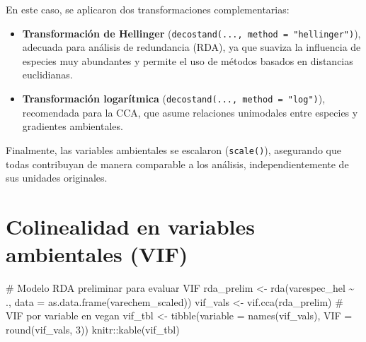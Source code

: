 \documentclass[
  spanish,
  11pt,
  a4paper,
  DIV=11,
  numbers=noendperiod]{scrartcl}
\newenvironment{Shaded}{\begin{snugshade}}{\end{snugshade}}
\newcommand{\AttributeTok}[1]{\textcolor[rgb]{0.40,0.45,0.13}{#1}}
\newcommand{\CommentTok}[1]{\textcolor[rgb]{0.37,0.37,0.37}{#1}}
\newcommand{\DecValTok}[1]{\textcolor[rgb]{0.68,0.00,0.00}{#1}}
\newcommand{\FunctionTok}[1]{\textcolor[rgb]{0.28,0.35,0.67}{#1}}
\newcommand{\NormalTok}[1]{\textcolor[rgb]{0.00,0.23,0.31}{#1}}
\newcommand{\OtherTok}[1]{\textcolor[rgb]{0.00,0.23,0.31}{#1}}
\newcommand{\SpecialCharTok}[1]{\textcolor[rgb]{0.37,0.37,0.37}{#1}}
\begin{document}
En este caso, se aplicaron dos transformaciones complementarias:

\begin{itemize}
\item
  \textbf{Transformación de Hellinger}
  (\texttt{decostand(...,\ method\ =\ "hellinger")}), adecuada para
  análisis de redundancia (RDA), ya que suaviza la influencia de
  especies muy abundantes y permite el uso de métodos basados en
  distancias euclidianas.
\item
  \textbf{Transformación logarítmica}
  (\texttt{decostand(...,\ method\ =\ "log")}), recomendada para la CCA,
  que asume relaciones unimodales entre especies y gradientes
  ambientales.
\end{itemize}

Finalmente, las variables ambientales se escalaron (\texttt{scale()}),
asegurando que todas contribuyan de manera comparable a los análisis,
independientemente de sus unidades originales.

\section{Colinealidad en variables ambientales
(VIF)}\label{colinealidad-en-variables-ambientales-vif}

\begin{Shaded}
\begin{Highlighting}[numbers=left,,]
\CommentTok{\# Modelo RDA preliminar para evaluar VIF}
\NormalTok{rda\_prelim }\OtherTok{\textless{}{-}} \FunctionTok{rda}\NormalTok{(varespec\_hel }\SpecialCharTok{\textasciitilde{}}\NormalTok{ ., }\AttributeTok{data =} \FunctionTok{as.data.frame}\NormalTok{(varechem\_scaled))}
\NormalTok{vif\_vals }\OtherTok{\textless{}{-}} \FunctionTok{vif.cca}\NormalTok{(rda\_prelim)  }\CommentTok{\# VIF por variable en vegan}
\NormalTok{vif\_tbl }\OtherTok{\textless{}{-}} \FunctionTok{tibble}\NormalTok{(}\AttributeTok{variable =} \FunctionTok{names}\NormalTok{(vif\_vals), }\AttributeTok{VIF =} \FunctionTok{round}\NormalTok{(vif\_vals, }\DecValTok{3}\NormalTok{))}
\NormalTok{knitr}\SpecialCharTok{::}\FunctionTok{kable}\NormalTok{(vif\_tbl)}
\end{Highlighting}
\end{Shaded}
\end{document}
